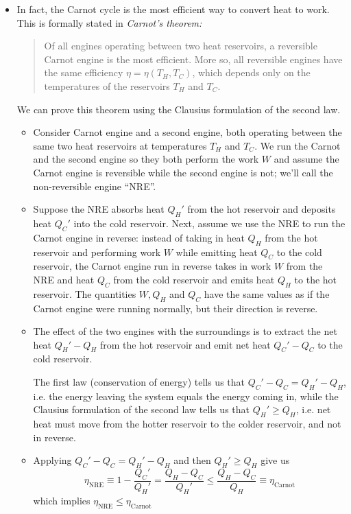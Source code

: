 \documentclass[11pt, a4paper]{article}
\begin{document}
\begin{itemize}
	 \item In fact, the Carnot cycle is the most efficient way to convert heat to work. This is formally stated in \textit{Carnot's theorem:}
	\begin{quote}
	 	Of all engines operating between two heat reservoirs, a reversible Carnot engine is the most efficient. More so, all reversible engines have the same efficiency $ \eta = \eta (T_{H}, T_{C}) $, which depends only on the temperatures of the reservoirs $ T_{H} $ and $ T_{C} $.
	\end{quote}
	We can prove this theorem using the Clausius formulation of the second law. 
	\begin{itemize}
		\item Consider Carnot engine and a second engine, both operating between the same two heat reservoirs at temperatures $ T_{H} $ and $ T_{C} $. We run the Carnot and the second engine so they both perform the work $ W $ and assume the Carnot engine is reversible while the second engine is not; we'll call the non-reversible engine ``NRE''. 
		
		\item 	Suppose the NRE absorbs heat $ Q_{H}' $  from the hot reservoir and deposits heat $ Q_{C}' $ into the cold reservoir. Next, assume we use the NRE to run the Carnot engine in reverse: instead of taking in heat $ Q_{H} $ from the hot reservoir and performing work $ W $ while emitting heat $ Q_{C} $ to the cold reservoir, the Carnot engine run in reverse takes in work $ W $ from the NRE and heat $ Q_{C} $ from the cold reservoir and emits heat $ Q_{H} $ to the hot reservoir. The quantities $ W, Q_{H} $ and $ Q_{C} $ have the same values as if the Carnot engine were running normally, but their direction is reverse.
		
		\item The effect of the two engines with the surroundings is to extract the net heat $ Q_{H}' - Q_{H} $ from the hot reservoir and emit net heat $ Q_{C}' - Q_{C} $ to the cold reservoir. 
		
		The first law (conservation of energy) tells us that $ Q_{C}' - Q_{C} = Q_{H}' - Q_{H}$, i.e. the energy leaving the system equals the energy coming in, while the Clausius formulation of the second law tells us that $  Q_{H}' \geq Q_{H}  $, i.e. net heat must move from the hotter reservoir to the colder reservoir, and not in reverse. 
		
		\item Applying $ Q_{C}' - Q_{C} = Q_{H}' - Q_{H} $ and then $ Q_{H}' \geq Q_{H} $ give us
		\begin{equation*}
			\eta_{\text{NRE}} \equiv 1 - \frac{Q_{C}'}{Q_{H}'} = \frac{Q_{H} - Q_{C}}{Q_{H}'} \leq \frac{Q_{H} - Q_{C}}{Q_{H}} \equiv \eta_{\text{Carnot}}
		\end{equation*}
		which implies $ \eta_{\text{NRE}} \leq \eta_{\text{Carnot}} $
		

\end{itemize}
\end{itemize}
\end{document}
